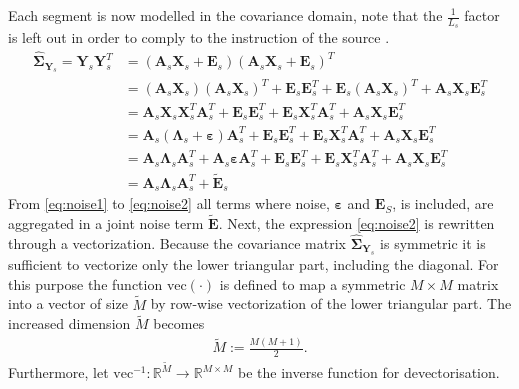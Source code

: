 Each segment is now modelled in the covariance domain, note that the $\frac{1}{L_s}$ factor is left out in order to comply to the instruction of the source \cite{Balkan2015}.
\begin{align} 
\widehat{\boldsymbol{\Sigma}}_{\mathbf{Y}_s} = \mathbf{Y}_s \mathbf{Y}_s^T &=  \left( \mathbf{A}_s \mathbf{X}_s + \mathbf{E}_s \right) \left( \mathbf{A}_s \mathbf{X}_s + \mathbf{E}_s\right)^T \nonumber \\ 
 &=  (\textbf{A}_s\textbf{X}_s)(\textbf{A}_s\textbf{X}_s)^T + \textbf{E}_s \textbf{E}_s^T + \textbf{E}_s (\textbf{A}_s\textbf{X}_s)^T + \textbf{A}_s\textbf{X}_s \textbf{E}_s^T  \nonumber \\
&= \textbf{A}_s\textbf{X}_s \textbf{X}_s^T \textbf{A}_s^T + \textbf{E}_s \textbf{E}_s^T + \textbf{E}_s \textbf{X}_s^T \textbf{A}_s^T + \textbf{A}_s\textbf{X}_s \textbf{E}_s^T  \nonumber \\
&= \textbf{A}_s(\boldsymbol{\Lambda}_s +\boldsymbol{\varepsilon}) \textbf{A}_s^T + \textbf{E}_s \textbf{E}_s^T + \textbf{E}_s \textbf{X}_s^T \textbf{A}_s^T + \textbf{A}_s\textbf{X}_s \textbf{E}_s^T \nonumber \\
&= \textbf{A}_s \boldsymbol{\Lambda}_s \textbf{A}_s^T + \textbf{A}_s \boldsymbol{\varepsilon} \textbf{A}_s^T + \textbf{E}_s \textbf{E}_s^T + \textbf{E}_s \textbf{X}_s^T \textbf{A}_s^T + \textbf{A}_s\textbf{X}_s \textbf{E}_s^T \label{eq:noise1} \\
&= \textbf{A}_s \boldsymbol{\Lambda}_s \textbf{A}_s^T + \widetilde{\textbf{E}}_s \label{eq:noise2}
\end{align}
From \eqref{eq:noise1} to \eqref{eq:noise2} all terms where noise, $\boldsymbol{\varepsilon}$ and $\mathbf{E}_S$, is included, are aggregated in a joint noise term $\widetilde{\textbf{E}}$. 
Next, the expression \eqref{eq:noise2} is rewritten through a vectorization. 
Because the covariance matrix $\widehat{\boldsymbol{\Sigma}}_{\mathbf{Y}_s}$ is symmetric it is sufficient to vectorize only the lower triangular part, including the diagonal. 
For this purpose the function $\text{vec}(\cdot)$ is defined to map a symmetric $M \times M$ matrix into a vector of size $\widetilde{M}$ by row-wise vectorization of the lower triangular part. The increased dimension $\widetilde{M}$ becomes 
\begin{align}
\widetilde{M} := \frac{M(M+1)}{2}.
\end{align}
Furthermore, let $\text{vec}^{-1}: \mathbb{R}^{\widetilde{M}} \rightarrow \mathbb{R}^{M\times M}$ be the inverse function for devectorisation. 

